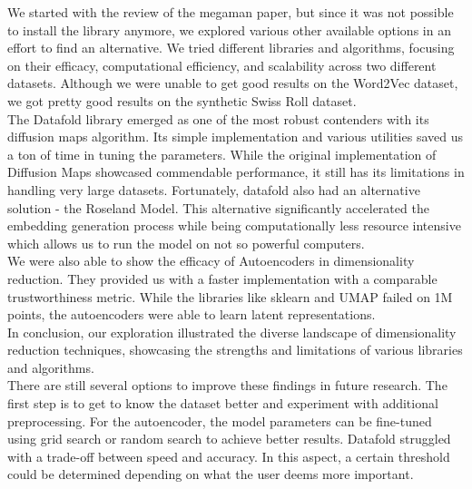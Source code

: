 We started with the review of the megaman paper, but since it was not possible to install the library anymore, we explored various other available options in an effort to find an alternative. We tried different libraries and algorithms, focusing on their efficacy, computational efficiency, and scalability across two different datasets. Although we were unable to get good results on the Word2Vec dataset, we got pretty good results on the synthetic Swiss Roll dataset.\\

The Datafold library emerged as one of the most robust contenders with its diffusion maps algorithm. Its simple implementation and various utilities saved us a ton of time in tuning the parameters. While the original implementation of Diffusion Maps showcased commendable performance, it still has its limitations in handling very large datasets. Fortunately, datafold also had an alternative solution - the Roseland Model. This alternative significantly accelerated the embedding generation process while being computationally less resource intensive which allows us to run the model on not so powerful computers.\\

We were also able to show the efficacy of Autoencoders in dimensionality reduction. They provided us with a faster implementation with a comparable trustworthiness metric. While the libraries like sklearn and UMAP failed on 1M points, the autoencoders were able to learn latent representations.\\

In conclusion, our exploration illustrated the diverse landscape of dimensionality reduction techniques, showcasing the strengths and limitations of various libraries and algorithms. \\

There are still several options to improve these findings in future research. The first step is to get to know the dataset better and experiment with additional preprocessing. For the autoencoder, the model parameters can be fine-tuned using grid search or random search to achieve better results. Datafold struggled with a trade-off between speed and accuracy. In this aspect, a certain threshold could be determined depending on what the user deems more important. 



